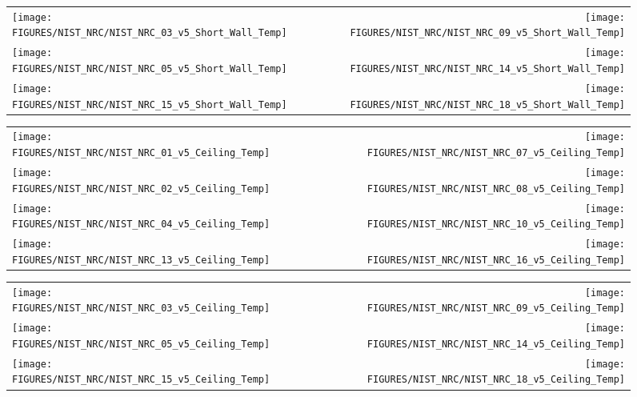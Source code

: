\begin{figure}[p]
\begin{tabular*}{\textwidth}{l@{\extracolsep{\fill}}r}
\texttt{[image: FIGURES/NIST\_NRC/NIST\_NRC\_03\_v5\_Short\_Wall\_Temp]} &
\texttt{[image: FIGURES/NIST\_NRC/NIST\_NRC\_09\_v5\_Short\_Wall\_Temp]} \\
\texttt{[image: FIGURES/NIST\_NRC/NIST\_NRC\_05\_v5\_Short\_Wall\_Temp]} &
\texttt{[image: FIGURES/NIST\_NRC/NIST\_NRC\_14\_v5\_Short\_Wall\_Temp]} \\
\texttt{[image: FIGURES/NIST\_NRC/NIST\_NRC\_15\_v5\_Short\_Wall\_Temp]} &
\texttt{[image: FIGURES/NIST\_NRC/NIST\_NRC\_18\_v5\_Short\_Wall\_Temp]}
\end{tabular*}
\label{NIST_NRC_Short_Wall_Temp_Open}
\end{figure}

\begin{figure}[p]
\begin{tabular*}{\textwidth}{l@{\extracolsep{\fill}}r}
\texttt{[image: FIGURES/NIST\_NRC/NIST\_NRC\_01\_v5\_Ceiling\_Temp]} &
\texttt{[image: FIGURES/NIST\_NRC/NIST\_NRC\_07\_v5\_Ceiling\_Temp]} \\
\texttt{[image: FIGURES/NIST\_NRC/NIST\_NRC\_02\_v5\_Ceiling\_Temp]} &
\texttt{[image: FIGURES/NIST\_NRC/NIST\_NRC\_08\_v5\_Ceiling\_Temp]} \\
\texttt{[image: FIGURES/NIST\_NRC/NIST\_NRC\_04\_v5\_Ceiling\_Temp]} &
\texttt{[image: FIGURES/NIST\_NRC/NIST\_NRC\_10\_v5\_Ceiling\_Temp]} \\
\texttt{[image: FIGURES/NIST\_NRC/NIST\_NRC\_13\_v5\_Ceiling\_Temp]} &
\texttt{[image: FIGURES/NIST\_NRC/NIST\_NRC\_16\_v5\_Ceiling\_Temp]}
\end{tabular*}
\label{NIST_NRC_Ceiling_Temp_Closed}
\end{figure}

\begin{figure}[p]
\begin{tabular*}{\textwidth}{l@{\extracolsep{\fill}}r}
\texttt{[image: FIGURES/NIST\_NRC/NIST\_NRC\_03\_v5\_Ceiling\_Temp]} &
\texttt{[image: FIGURES/NIST\_NRC/NIST\_NRC\_09\_v5\_Ceiling\_Temp]} \\
\texttt{[image: FIGURES/NIST\_NRC/NIST\_NRC\_05\_v5\_Ceiling\_Temp]} &
\texttt{[image: FIGURES/NIST\_NRC/NIST\_NRC\_14\_v5\_Ceiling\_Temp]} \\
\texttt{[image: FIGURES/NIST\_NRC/NIST\_NRC\_15\_v5\_Ceiling\_Temp]} &
\texttt{[image: FIGURES/NIST\_NRC/NIST\_NRC\_18\_v5\_Ceiling\_Temp]}
\end{tabular*}
\label{NIST_NRC_Ceiling_Temp_Open}
\end{figure}

